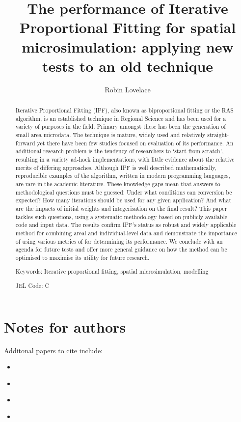 \documentclass[a4paper,10pt]{article}
\title{The performance of Iterative Proportional Fitting for spatial microsimulation: applying new tests to an old technique}
\author{Robin Lovelace}
\begin{document}
\maketitle

\begin{abstract}
Iterative Proportional Fitting (IPF), also known as biproportional fitting or the RAS algorithm,
is an established technique in Regional Science and
 has been used for a variety of purposes in the field. Primary amongst these has been
the generation of small area microdata.  
The technique is mature, widely used and relatively straight-forward
yet there have been few studies focused on evaluation of its performance.
An additional research problem is the tendency of 
researchers to `start from scratch', resulting in a variety ad-hock implementations,
with little evidence about the relative merits of differing approaches.
Although IPF is well described mathematically, reproducible
examples of the algorithm, written in modern programming languages, are rare in the academic literature.
These knowledge gaps mean that answers to methodological questions must be guessed:
Under what conditions can conversion be expected?
How many iterations should be used for any given application? 
And what are the impacts of initial weights and integerisation on the final result?
This paper tackles such questions, using a systematic methodology 
based on publicly available code and input data. 
The results confirm IPF's status as robust and widely applicable 
method for combining areal and individual-level data and demonstrate the importance
of using various metrics of for determining its performance.
We conclude with an agenda for future tests and offer more general guidance on how
the method can be optimised to maximise its utility for future research.

Keywords: Iterative proportional fitting, spatial microsimulation, modelling

JEL Code: C
\end{abstract}

\section{Notes for authors}
Additonal papers to cite include:
\begin{itemize}
 \item \citet{harland2012}
\item \citet{Smith2009}
\item \citet{Cullinan2010}
\item 
\end{itemize}
\end{document}
